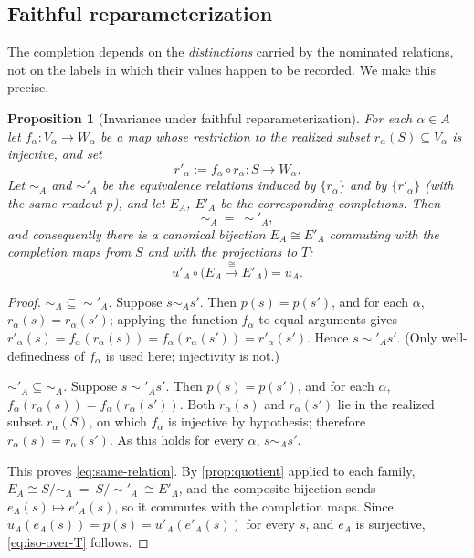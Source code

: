 \documentclass[11pt,reqno]{amsart}
\theoremstyle{plain}
\newtheorem{proposition}[theorem]{Proposition}
\theoremstyle{definition}
\theoremstyle{remark}
\numberwithin{equation}{section}
\begin{document}
\subsection{Faithful reparameterization}

The completion depends on the \emph{distinctions} carried by the nominated relations, not on the
labels in which their values happen to be recorded. We make this precise.

\begin{proposition}[Invariance under faithful reparameterization]
\label{prop:reparam}
For each $\alpha\in A$ let $f_\alpha\colon V_\alpha\to W_\alpha$ be a map whose restriction to the
realized subset $r_\alpha(S)\subseteq V_\alpha$ is injective, and set
\begin{equation}
\label{eq:reparam}
r'_\alpha:=f_\alpha\circ r_\alpha\colon S\to W_\alpha .
\end{equation}
Let $\sim_A$ and $\sim'_A$ be the equivalence relations induced by $\{r_\alpha\}$ and by
$\{r'_\alpha\}$ (with the same readout $p$), and let $E_A$, $E'_A$ be the corresponding completions.
Then
\begin{equation}
\label{eq:same-relation}
\sim_A\ =\ \sim'_A ,
\end{equation}
and consequently there is a canonical bijection $E_A\cong E'_A$ commuting with the completion maps
from $S$ and with the projections to $T$:
\begin{equation}
\label{eq:iso-over-T}
u'_A\circ\bigl(E_A\xrightarrow{\ \cong\ }E'_A\bigr)=u_A .
\end{equation}
\end{proposition}

\begin{proof}
\emph{$\sim_A\subseteq\sim'_A$.} Suppose $s\sim_A s'$. Then $p(s)=p(s')$, and for each $\alpha$,
$r_\alpha(s)=r_\alpha(s')$; applying the function $f_\alpha$ to equal arguments gives
$r'_\alpha(s)=f_\alpha(r_\alpha(s))=f_\alpha(r_\alpha(s'))=r'_\alpha(s')$. Hence $s\sim'_A s'$. (Only
well-definedness of $f_\alpha$ is used here; injectivity is not.)

\emph{$\sim'_A\subseteq\sim_A$.} Suppose $s\sim'_A s'$. Then $p(s)=p(s')$, and for each $\alpha$,
$f_\alpha(r_\alpha(s))=f_\alpha(r_\alpha(s'))$. Both $r_\alpha(s)$ and $r_\alpha(s')$ lie in the
realized subset $r_\alpha(S)$, on which $f_\alpha$ is injective by hypothesis; therefore
$r_\alpha(s)=r_\alpha(s')$. As this holds for every $\alpha$, $s\sim_A s'$.

This proves \eqref{eq:same-relation}. By \cref{prop:quotient} applied to each family,
$E_A\cong S/\!\sim_A\ =\ S/\!\sim'_A\ \cong E'_A$, and the composite bijection sends
$e_A(s)\mapsto e'_A(s)$, so it commutes with the completion maps. Since $u_A(e_A(s))=p(s)=u'_A(e'_A(s))$
for every $s$, and $e_A$ is surjective, \eqref{eq:iso-over-T} follows.
\end{proof}
\end{document}
